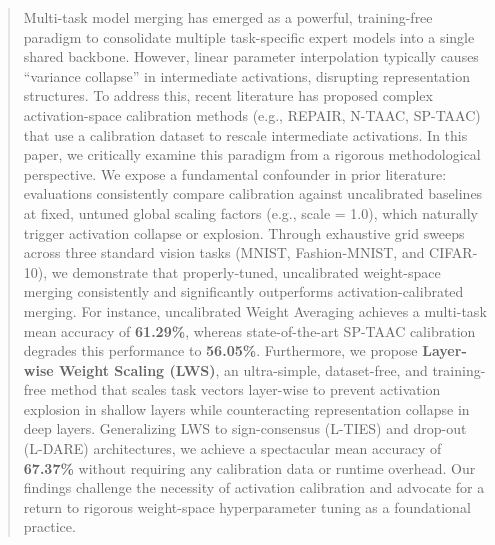\documentclass{article}
\theoremstyle{plain}
\theoremstyle{definition}
\theoremstyle{remark}
\begin{document}

\printAffiliationsAndNotice{\icmlEqualContribution}

\begin{abstract}
Multi-task model merging has emerged as a powerful, training-free paradigm to consolidate multiple task-specific expert models into a single shared backbone. However, linear parameter interpolation typically causes ``variance collapse'' in intermediate activations, disrupting representation structures. To address this, recent literature has proposed complex activation-space calibration methods (e.g., REPAIR, N-TAAC, SP-TAAC) that use a calibration dataset to rescale intermediate activations. In this paper, we critically examine this paradigm from a rigorous methodological perspective. We expose a fundamental confounder in prior literature: evaluations consistently compare calibration against uncalibrated baselines at fixed, untuned global scaling factors (e.g., scale = 1.0), which naturally trigger activation collapse or explosion. Through exhaustive grid sweeps across three standard vision tasks (MNIST, Fashion-MNIST, and CIFAR-10), we demonstrate that properly-tuned, uncalibrated weight-space merging consistently and significantly outperforms activation-calibrated merging. For instance, uncalibrated Weight Averaging achieves a multi-task mean accuracy of \textbf{61.29\%}, whereas state-of-the-art SP-TAAC calibration degrades this performance to \textbf{56.05\%}. Furthermore, we propose \textbf{Layer-wise Weight Scaling (LWS)}, an ultra-simple, dataset-free, and training-free method that scales task vectors layer-wise to prevent activation explosion in shallow layers while counteracting representation collapse in deep layers. Generalizing LWS to sign-consensus (L-TIES) and drop-out (L-DARE) architectures, we achieve a spectacular mean accuracy of \textbf{67.37\%} without requiring any calibration data or runtime overhead. Our findings challenge the necessity of activation calibration and advocate for a return to rigorous weight-space hyperparameter tuning as a foundational practice.
\end{abstract}
\end{document}
